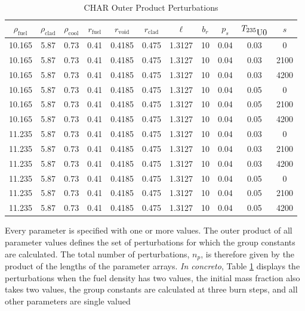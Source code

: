 \begin{table}[htbp]
\begin{center}
\caption{CHAR Outer Product Perturbations}
\label{char_param_outer_product}
\begin{tabular}{|ccccccccccc|}
\hline
\textbf{$\rho_{\mbox{fuel}}$} & \textbf{$\rho_{\mbox{clad}}$} & \textbf{$\rho_{\mbox{cool}}$} & \textbf{$r_{\mbox{fuel}}$} & \textbf{$r_{\mbox{void}}$} & \textbf{$r_{\mbox{clad}}$} & \textbf{$\ell$} & \textbf{$b_r$} & \textbf{$p_s$} & \textbf{$T_{\mbox{\nuc{U}{235}0}}$} & \textbf{$s$} \\
\hline
10.165 & 5.87 & 0.73 & 0.41 & 0.4185 & 0.475 & 1.3127 & 10 & 0.04 & 0.03 & 0    \\ 
10.165 & 5.87 & 0.73 & 0.41 & 0.4185 & 0.475 & 1.3127 & 10 & 0.04 & 0.03 & 2100 \\ 
10.165 & 5.87 & 0.73 & 0.41 & 0.4185 & 0.475 & 1.3127 & 10 & 0.04 & 0.03 & 4200 \\ 
10.165 & 5.87 & 0.73 & 0.41 & 0.4185 & 0.475 & 1.3127 & 10 & 0.04 & 0.05 & 0    \\ 
10.165 & 5.87 & 0.73 & 0.41 & 0.4185 & 0.475 & 1.3127 & 10 & 0.04 & 0.05 & 2100 \\ 
10.165 & 5.87 & 0.73 & 0.41 & 0.4185 & 0.475 & 1.3127 & 10 & 0.04 & 0.05 & 4200 \\ 
11.235 & 5.87 & 0.73 & 0.41 & 0.4185 & 0.475 & 1.3127 & 10 & 0.04 & 0.03 & 0    \\ 
11.235 & 5.87 & 0.73 & 0.41 & 0.4185 & 0.475 & 1.3127 & 10 & 0.04 & 0.03 & 2100 \\ 
11.235 & 5.87 & 0.73 & 0.41 & 0.4185 & 0.475 & 1.3127 & 10 & 0.04 & 0.03 & 4200 \\ 
11.235 & 5.87 & 0.73 & 0.41 & 0.4185 & 0.475 & 1.3127 & 10 & 0.04 & 0.05 & 0    \\ 
11.235 & 5.87 & 0.73 & 0.41 & 0.4185 & 0.475 & 1.3127 & 10 & 0.04 & 0.05 & 2100 \\ 
11.235 & 5.87 & 0.73 & 0.41 & 0.4185 & 0.475 & 1.3127 & 10 & 0.04 & 0.05 & 4200 \\ 
\hline
\end{tabular}
\end{center}
\end{table}

Every parameter is specified with one or more values.  The outer product of all parameter
values defines the set of perturbations for which the group constants are calculated.
The total number of perturbations, $n_p$, is therefore given by the product of 
the lengths of the parameter arrays.  \emph{In concreto}, Table \ref{char_param_outer_product} 
displays the perturbations when the fuel density has two values, the initial  mass 
fraction also takes two values, the group constants are calculated at three burn steps, and all 
other parameters are single valued

